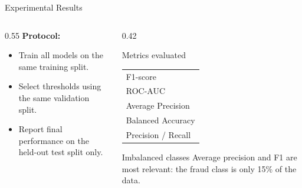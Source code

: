 \documentclass[10pt]{beamer}
\begin{document}
\begin{frame}{Experimental Results}
  \begin{columns}[T]
    \begin{column}{0.55\textwidth}
      \textbf{Protocol:}
      \begin{itemize}
          \item Train all models on the same training split.
    \item Select thresholds using the same validation split.
    \item Report final performance on the held-out test split only.
      \end{itemize}
      \vspace{0.5em}

    \end{column}
    \begin{column}{0.42\textwidth}
      \begin{block}{Metrics evaluated}
        \begin{tabular}{l}
          F1-score \\
          ROC-AUC \\
          Average Precision \\
          Balanced Accuracy \\
          Precision / Recall \\
        \end{tabular}
      \end{block}

      \vspace{0.5em}
      \begin{alertblock}{Imbalanced classes}
        Average precision and F1 are most relevant: the fraud class is only 15\% of the data.
      \end{alertblock}
    \end{column}
  \end{columns}
\end{frame}
\end{document}
